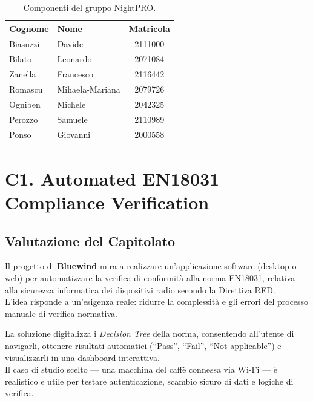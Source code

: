 \documentclass[a4paper, 11pt, oneside]{scrartcl} %
\begin{document}
\begin{table}[h!]
\centering
\renewcommand{\arraystretch}{1.2} %
\begin{tabular}{@{}llc@{}}
\toprule
\textbf{Cognome} & \textbf{Nome} & \textbf{Matricola} \\
\midrule
Biasuzzi & Davide & 2111000 \\
Bilato & Leonardo & 2071084 \\
Zanella & Francesco & 2116442 \\
Romascu & Mihaela-Mariana & 2079726 \\
Ogniben & Michele & 2042325 \\
Perozzo & Samuele & 2110989 \\
Ponso & Giovanni & 2000558 \\
\bottomrule
\end{tabular}
\caption{Componenti del gruppo NightPRO.}
\end{table}



\newpage
\section{C1. Automated EN18031 Compliance Verification}
\subsection*{Valutazione del Capitolato}
Il progetto di \textbf{Bluewind} mira a realizzare un’applicazione software (desktop o web) per automatizzare la verifica di conformità alla norma EN18031, relativa alla sicurezza informatica dei dispositivi radio secondo la Direttiva RED.\\
L’idea risponde a un’esigenza reale: ridurre la complessità e gli errori del processo manuale di verifica normativa.

La soluzione digitalizza i \emph{Decision Tree} della norma, consentendo all’utente di navigarli, ottenere risultati automatici (“Pass”, “Fail”, “Not applicable”) e visualizzarli in una dashboard interattiva.\\
Il caso di studio scelto — una macchina del caffè connessa via Wi-Fi — è realistico e utile per testare autenticazione, scambio sicuro di dati e logiche di verifica.
\end{document}
